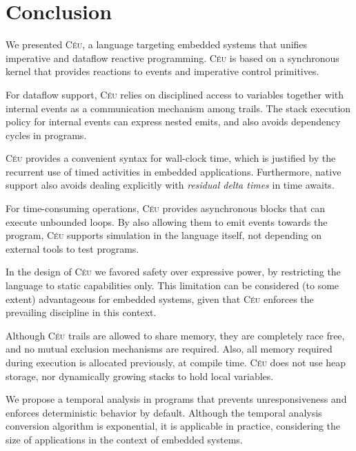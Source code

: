 \documentclass[11pt,a4paper]{article}
\newcommand{\2}{\;\;}
\newcommand{\5}{\;\;\;\;\;}
\newcommand{\CEU}{\textsc{C\'{e}u}}
\begin{document}

\section{Conclusion}
\label{sec:conclusion}

We presented \CEU, a language targeting embedded systems that unifies 
imperative and dataflow reactive programming.
\CEU{} is based on a synchronous kernel that provides reactions to events and 
imperative control primitives.

For dataflow support, \CEU{} relies on disciplined access to variables together 
with internal events as a communication mechanism among trails.
The stack execution policy for internal events can express nested emits, and 
also avoids dependency cycles in programs.

\CEU{} provides a convenient syntax for wall-clock time, which is justified by 
the recurrent use of timed activities in embedded applications.
Furthermore, native support also avoids dealing explicitly with \emph{residual 
delta times} in time awaits.

For time-consuming operations, \CEU{} provides asynchronous blocks that can 
execute unbounded loops.
By also allowing them to emit events towards the program, \CEU{} supports 
simulation in the language itself, not depending on external tools to test 
programs.

In the design of \CEU{} we favored safety over expressive power, by restricting 
the language to static capabilities only.
This limitation can be considered (to some extent) advantageous for embedded 
systems, given that \CEU{} enforces the prevailing discipline in this context.

Although \CEU{} trails are allowed to share memory, they are completely race 
free, and no mutual exclusion mechanisms are required.
Also, all memory required during execution is allocated previously, at compile 
time.
\CEU{} does not use heap storage, nor dynamically growing stacks to hold local 
variables.

We propose a temporal analysis in programs that prevents unresponsiveness and 
enforces deterministic behavior by default.
Although the temporal analysis conversion algorithm is exponential, it is 
applicable in practice, considering the size of applications in the context of 
embedded systems.
\end{document}
